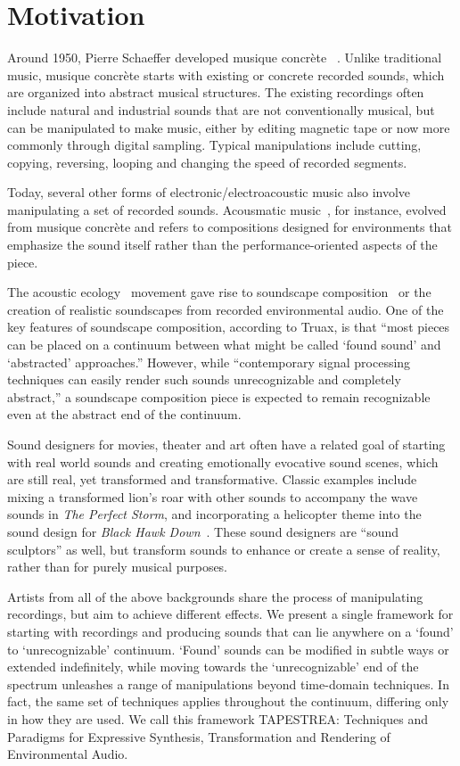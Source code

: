 \documentclass[10pt,letterpaper]{article}
\begin{document}
\section{Motivation}

\noindent
Around 1950, Pierre  Schaeffer  developed  musique
concr\`{e}te ~\cite{Schaeffer50,Schaeffer52}.  Unlike traditional music,
musique concr\`ete starts with existing or concrete rec\-orded sounds,
which are organized into abstract musical structures. The existing
recordings often include natural and industrial sounds that are not
conventionally musical, but can be manipulated to make music, either by
editing magnetic tape or now more commonly through digital sampling.
Typical manipulations include cutting, copying, reversing, looping and
changing the speed of recorded segments.

Today, several other forms of electronic/electroacoustic music also
involve manipulating a set of recorded sounds. Acousmatic
music~\cite{Dhomont95}, for instance, evolved from musique concr\`ete
and refers to compositions designed for environments that emphasize the
sound itself rather than the performance-oriented aspects of the piece.

The acoustic ecology~\cite{Schafer77} movement gave rise to soundscape
composition~\cite{Truax02} or the creation of realistic
soundscapes from recorded environmental audio. One of the key features
of soundscape composition, according to Truax, is that ``most pieces can
be placed on a continuum between what might be called `found sound' and
`abstracted' approaches.'' However, while ``contemporary signal
processing techniques can easily render such sounds unrecognizable and
completely abstract,'' a soundscape composition piece is expected to
remain recognizable even at the abstract end of the continuum.

Sound designers for movies, theater and art often have a related goal of
starting with real world sounds and creating emotionally evocative sound
scenes, which are still real, yet transformed and transformative.
Classic examples include mixing a transformed lion's roar with other
sounds to accompany the wave sounds in \textit{The Perfect Storm}, and
incorporating a helicopter theme into the sound design for \textit{Black
Hawk Down}~\cite{Rudy04}.  These sound designers are ``sound sculptors''
as well, but transform sounds to enhance or create a sense of reality,
rather than for purely musical purposes.

Artists from all of the above backgrounds share the process
of manipulating recordings, but aim to achieve different
effects. We present a single framework for starting with
recordings and producing sounds that can lie anywhere on a
`found' to `unrecognizable' continuum. `Found' sounds can
be modified in subtle ways or extended indefinitely, while
moving towards the `unrecognizable' end of the spectrum unleashes
a range of manipulations beyond time-domain techniques.
In fact, the same set of techniques applies throughout
the continuum, differing only in how they are used. We call
this framework TAPESTREA: Techniques and Paradigms for
Expressive Synthesis, Transformation and Rendering of Environmental
Audio.
\end{document}

